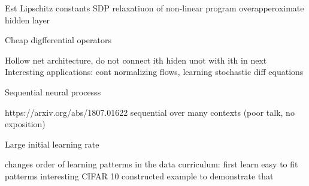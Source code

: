 \documentclass[12pt,a4paper]{article}
\begin{document}

Est Lipschitz constants
SDP relaxatiuon of non-linear program 
overapperoximate hidden layer 

Cheap digfferential operators

Hollow net architecture, do not connect ith hiden unot with ith in next 
Interesting applications: cont normalizing flows, learning stochastic diff equations 

Sequential neural processs

https://arxiv.org/abs/1807.01622
sequential over many contexts
(poor talk, no exposition)


Large initial learning rate 

changes order of learning patterms in the data 
curriculum: first learn easy to fit patterms
interesting CIFAR 10 constructed example to demonstrate that 



\end{document}
